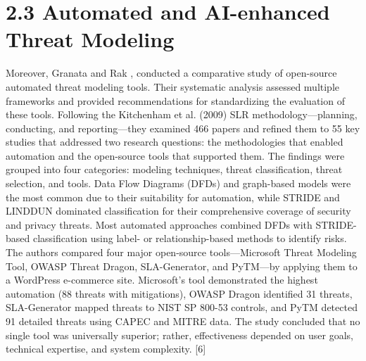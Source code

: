 \documentclass[12pt,a4paper]{report}
\begin{document}
\section{2.3 Automated and AI-enhanced Threat Modeling}

Moreover, Granata and Rak , conducted a comparative study of open-source automated threat modeling tools. Their systematic analysis assessed multiple frameworks and provided recommendations for standardizing the evaluation of these tools. Following the Kitchenham et al. (2009) SLR methodology—planning, conducting, and reporting—they examined 466 papers and refined them to 55 key studies that addressed two research questions: the methodologies that enabled automation and the open-source tools that supported them. The findings were grouped into four categories: modeling techniques, threat classification, threat selection, and tools. Data Flow Diagrams (DFDs) and graph-based models were the most common due to their suitability for automation, while STRIDE and LINDDUN dominated classification for their comprehensive coverage of security and privacy threats. Most automated approaches combined DFDs with STRIDE-based classification using label- or relationship-based methods to identify risks. The authors compared four major open-source tools—Microsoft Threat Modeling Tool, OWASP Threat Dragon, SLA-Generator, and PyTM—by applying them to a WordPress e-commerce site. Microsoft’s tool demonstrated the highest automation (88 threats with mitigations), OWASP Dragon identified 31 threats, SLA-Generator mapped threats to NIST SP 800-53 controls, and PyTM detected 91 detailed threats using CAPEC and MITRE data. The study concluded that no single tool was universally superior; rather, effectiveness depended on user goals, technical expertise, and system complexity. [6]
\end{document}
